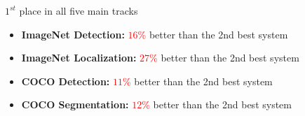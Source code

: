\begin{frame}
\begin{columns}
\begin{overlayarea}{\textwidth}{\textheight}
\begin{block}{$1^{st}$ place in all five main tracks}
\begin{itemize}
					\item<2-> \textbf{ImageNet Detection:} \textcolor{red}{$16$\%} better than the 2nd best system
					\item<3-> \textbf{ImageNet Localization:} \textcolor{red}{$27$\%} better than the 2nd best system
					\item<4-> \textbf{COCO Detection:} \textcolor{red}{$11$\%} better than the 2nd best system
					\item<5-> \textbf{COCO Segmentation:} \textcolor{red}{$12$\%} better than the 2nd best system
				\end{itemize}
			\end{block}
		\end{overlayarea}
	\end{columns}
\end{frame}


